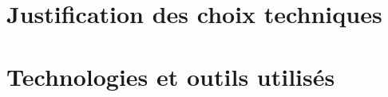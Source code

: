 \section{Justification des choix techniques} %
\label{sec:justification_du_choix_technique}


\section{Technologies et outils utilisés} %
\label{sec:technologies_et_outils_utilisés}

